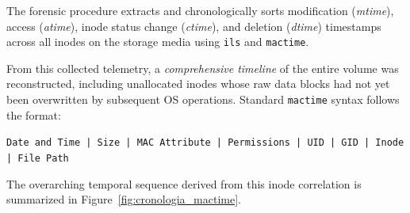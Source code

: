 The forensic procedure extracts and chronologically sorts modification (\textit{mtime}), access (\textit{atime}), inode status change (\textit{ctime}), and deletion (\textit{dtime}) timestamps across all inodes on the storage media using \texttt{ils} and \texttt{mactime}.

From this collected telemetry, a \emph{comprehensive timeline} of the entire volume was reconstructed, including unallocated inodes whose raw data blocks had not yet been overwritten by subsequent OS operations. Standard \texttt{mactime} syntax follows the format:

\noindent\texttt{Date and Time | Size | MAC Attribute | Permissions | UID | GID | Inode | File Path}

The overarching temporal sequence derived from this inode correlation is summarized in Figure~\ref{fig:cronologia_mactime}.

